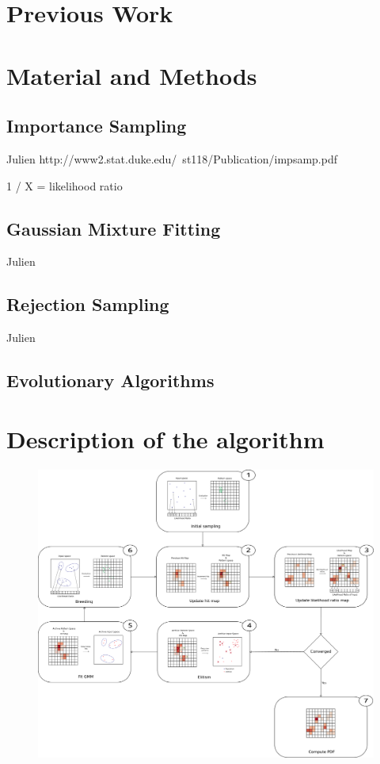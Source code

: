 \documentclass[10pt,a4paper]{article}
\theoremstyle{definition}
\theoremstyle{remark}
\begin{document}
\section{Previous Work}

\section{Material and Methods}


\subsection{Importance Sampling}

{\color{red} Julien} 
http://www2.stat.duke.edu/~st118/Publication/impsamp.pdf


1 / X = likelihood ratio

\subsection{Gaussian Mixture Fitting}

{\color{red} Julien} 

\subsection{Rejection Sampling}

{\color{red} Julien} 

\subsection{Evolutionary Algorithms}



\section{Description of the algorithm}\label{sec. algoDescription}



\begin{figure}
 \centering
  \includegraphics[width=0.8\linewidth]{images/schemaalgo.pdf}%
\end{figure}
\end{document}
